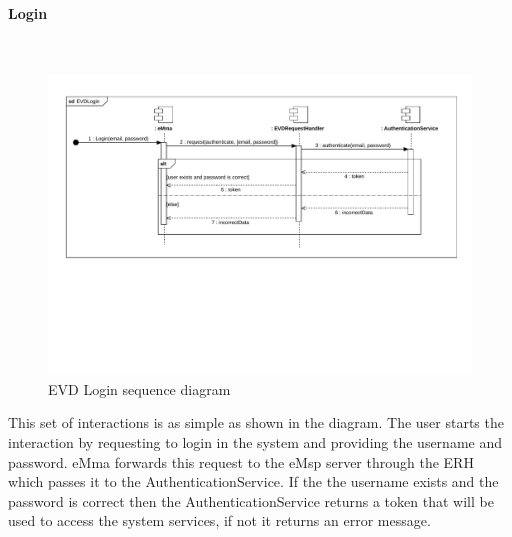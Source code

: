 \paragraph{Login}\mbox{}\
\begin{figure}[H]
    \centering
    \includegraphics[trim={0 20cm 0 0},clip, width=1\textwidth]{Images/cp2/runtime/Login.pdf}
    \caption{EVD Login sequence diagram}
\end{figure}
This set of interactions is as simple as shown in the diagram. The user starts the interaction by requesting to login in the system and providing the username and password. eMma forwards this request to the eMsp server through the ERH which passes it to the AuthenticationService. If the the username exists and the password is correct then the AuthenticationService returns a token that will be used to access the system services, if not it returns an error message.


